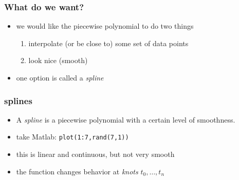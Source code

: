 \documentclass[10pt]{beamer}
\begin{document}
\begin{frame}
\frametitle{What do we want?}
\begin{itemize}
  \item we would like the piecewise polynomial to do two things
  \begin{enumerate}
    \item interpolate (or be close to) some set of data points
    \item look nice (smooth)
  \end{enumerate}
  \item one option is called a \emph{spline}
\end{itemize}
\end{frame}
\begin{frame}
\frametitle{splines}
\begin{itemize}
  \item A \emph{spline} is a piecewise polynomial with a certain level of
smoothness.
  \item take Matlab: \texttt{plot(1:7,rand(7,1))}
  \item this is linear and continuous, but not very smooth
  \item the function changes behavior at \emph{knots} $t_0,\dots,t_n$
\end{itemize}
\begin{center}
\end{center}
\end{frame}
\end{document}
